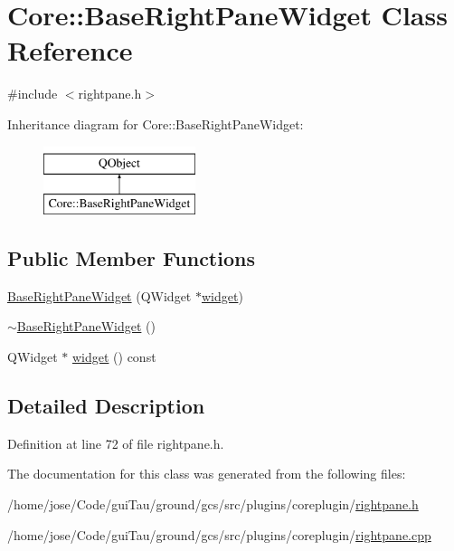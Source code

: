 \hypertarget{class_core_1_1_base_right_pane_widget}{\section{Core\-:\-:Base\-Right\-Pane\-Widget Class Reference}
\label{class_core_1_1_base_right_pane_widget}
}


{\ttfamily \#include $<$rightpane.\-h$>$}

Inheritance diagram for Core\-:\-:Base\-Right\-Pane\-Widget\-:\begin{figure}[H]
\begin{center}
\leavevmode
\includegraphics[height=2.000000cm]{class_core_1_1_base_right_pane_widget}
\end{center}
\end{figure}
\subsection*{Public Member Functions}
\begin{DoxyCompactItemize}
\item 
\hyperlink{group___core_plugin_ga648a6f106ea2b26a6ea483a1d880c8e0}{Base\-Right\-Pane\-Widget} (Q\-Widget $\ast$\hyperlink{group___core_plugin_ga232e880cc9c5025c590538ff61108f5f}{widget})
\item 
\hyperlink{group___core_plugin_gab6b58a6a058db3435d20951bbe98090e}{$\sim$\-Base\-Right\-Pane\-Widget} ()
\item 
Q\-Widget $\ast$ \hyperlink{group___core_plugin_ga232e880cc9c5025c590538ff61108f5f}{widget} () const 
\end{DoxyCompactItemize}


\subsection{Detailed Description}


Definition at line 72 of file rightpane.\-h.



The documentation for this class was generated from the following files\-:\begin{DoxyCompactItemize}
\item 
/home/jose/\-Code/gui\-Tau/ground/gcs/src/plugins/coreplugin/\hyperlink{rightpane_8h}{rightpane.\-h}\item 
/home/jose/\-Code/gui\-Tau/ground/gcs/src/plugins/coreplugin/\hyperlink{rightpane_8cpp}{rightpane.\-cpp}\end{DoxyCompactItemize}
